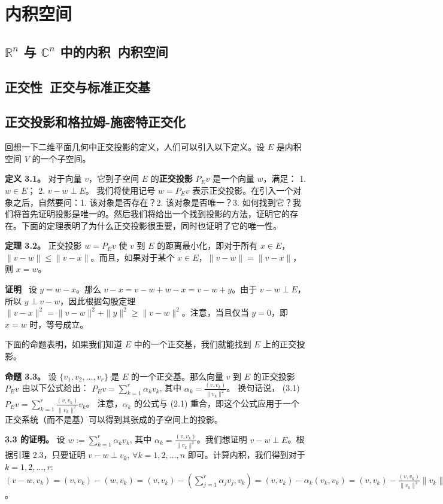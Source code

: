 \chapter{内积空间}

\section{$\mathbb{R}^n$ 与 $\mathbb{C}^n$ 中的内积~内积空间}

\section{正交性~正交与标准正交基}

\section{正交投影和格拉姆-施密特正交化}
回想一下二维平面几何中正交投影的定义，人们可以引入以下定义。设 $E$ 是内积空间 $V$ 的一个子空间。

\textbf{定义 3.1。} 对于向量 $v$，它到子空间 $E$ 的\textbf{正交投影} $P_E v$ 是一个向量 $w$，满足：
1. $w \in E$；
2. $v - w \perp E$。
我们将使用记号 $w = P_E v$ 表示正交投影。在引入一个对象之后，自然要问：1. 该对象是否存在？2. 该对象是否唯一？3. 如何找到它？我们将首先证明投影是唯一的。然后我们将给出一个找到投影的方法，证明它的存在。下面的定理表明了为什么正交投影很重要，同时也证明了它的唯一性。

\textbf{定理 3.2。} 正交投影 $w = P_E v$ 使 $v$ 到 $E$ 的距离最小化，即对于所有 $x \in E$，$\|v - w\| \leq \|v - x\|$。而且，如果对于某个 $x \in E$，$\|v - w\| = \|v - x\|$，则 $x = w$。

\textbf{证明}~ 设 $y = w - x$。那么 $v - x = v - w + w - x = v - w + y$。由于 $v - w \perp E$，所以 $y \perp v - w$，因此根据勾股定理 $\|v - x\|^2 = \|v - w\|^2 + \|y\|^2 \geq \|v - w\|^2$。注意，当且仅当 $y = 0$，即 $x = w$ 时，等号成立。

下面的命题表明，如果我们知道 $E$ 中的一个正交基，我们就能找到 $E$ 上的正交投影。

\textbf{命题 3.3。} 设 $\{v_1, v_2, \dots, v_r\}$ 是 $E$ 的一个正交基。那么向量 $v$ 到 $E$ 的正交投影 $P_E v$ 由以下公式给出：
$P_E v = \sum_{k=1}^r \alpha_k v_k$, 其中 $\alpha_k = \frac{(v, v_k)}{\|v_k\|^2}$。
换句话说，
(3.1) $P_E v = \sum_{k=1}^r \frac{(v, v_k)}{\|v_k\|^2} v_k$。
注意，$\alpha_k$ 的公式与 (2.1) 重合，即这个公式应用于一个正交系统（而不是基）可以得到其张成的子空间上的投影。

\textbf{3.3 的证明。} 设 $w := \sum_{k=1}^r \alpha_k v_k$, 其中 $\alpha_k = \frac{(v, v_k)}{\|v_k\|^2}$。我们想证明 $v - w \perp E$。根据引理 2.3，只要证明 $v - w \perp v_k$, $\forall k = 1, 2, \dots, n$ 即可。计算内积，我们得到对于 $k = 1, 2, \dots, r$:
$(v - w, v_k) = (v, v_k) - (w, v_k) = (v, v_k) - (\sum_{j=1}^r \alpha_j v_j, v_k) = (v, v_k) - \alpha_k (v_k, v_k) = (v, v_k) - \frac{(v, v_k)}{\|v_k\|^2} \|v_k\|^2 = 0$。

